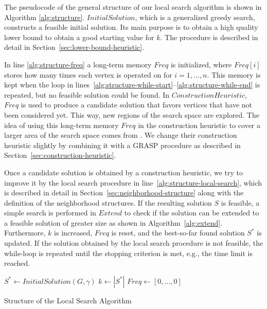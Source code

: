 \documentclass[draft,final]{vutinfth} %
\begin{document}
The pseudocode of the general structure of our local search algorithm is shown in Algorithm \ref{alg:structure}.
$\mathit{InitialSolution}$, which is a generalized greedy search, constructs a feasible initial solution. Its main purpose is to obtain a high quality lower bound to obtain a good starting value for $k$. The procedure is described in detail in Section~\ref{sec:lower-bound-heuristic}.

In line \ref{alg:structure-freq} a long-term memory $\mathit{Freq}$ is initialized, where $\mathit{Freq[i]}$ stores how many times each vertex is operated on for $i=1,\dots,n$. This memory is kept when the loop in lines~\ref{alg:structure-while-start}--\ref{alg:structure-while-end} is repeated, but no feasible solution could be found. In $\mathit{ConstructionHeuristic}$, $\mathit{Freq}$ is used to produce a candidate solution that favors vertices that have not been considered yet. This way, new regions of the search space are explored. The idea of using this long-term memory $\mathit{Freq}$ in the construction heuristic to cover a larger area of the search space comes from \cite{chen_nuqclq_2021}. We change their construction heuristic slightly by combining it with a GRASP procedure as described in Section~\ref{sec:construction-heuristic}. 

Once a candidate solution is obtained by a construction heuristic, we try to improve it by the local search procedure in line~\ref{alg:structure-local-search}, which is described in detail in Section~\ref{sec:neighborhood-structure} along with the definition of the neighborhood structures. If the resulting solution $S$ is feasible, a simple search is performed in $\mathit{Extend}$ to check if the solution can be extended to a feasible solution of greater size as shown in Algorithm~\ref{alg:extend}.
Furthermore, $k$ is increased, $\mathit{Freq}$ is reset, and the best-so-far found solution $S^*$ is updated. 
If the solution obtained by the local search procedure is not feasible, the while-loop is repeated until the stopping criterion is met, e.g., the time limit is reached. 

\begin{algorithm}
    \DontPrintSemicolon
    $S^* \gets \mathit{InitialSolution}(G, \gamma)$ \;
    $k \gets |S^*|$ \; \label{alg:structure-lower-bound}
    $\mathit{Freq} \gets [0, \dots, 0]$ \label{alg:structure-freq}  

    \caption{Structure of the Local Search Algorithm}
    \label{alg:structure}
\end{algorithm}
\end{document}
